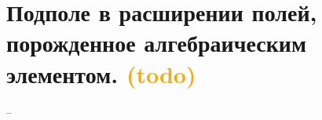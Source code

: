 \section{Подполе в расширении полей, порожденное алгебраическим элементом. \textcolor{orange}{(todo)}}

--